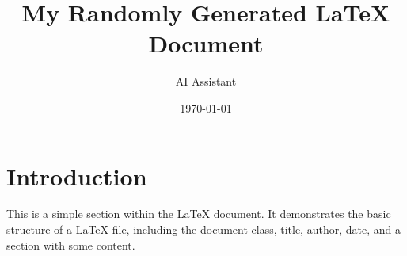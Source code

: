 \documentclass{article}
\title{My Randomly Generated LaTeX Document}
\author{AI Assistant}
\date{\today}
\begin{document}
\maketitle

\section{Introduction}
This is a simple section within the LaTeX document. It demonstrates the basic structure of a LaTeX file, including the document class, title, author, date, and a section with some content.
\end{document}
